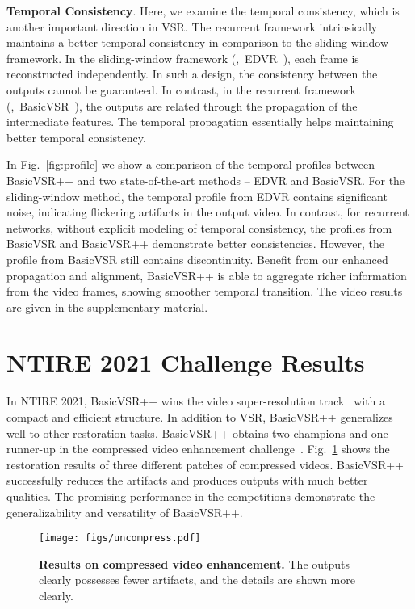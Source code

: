 \documentclass[10pt,twocolumn,letterpaper]{article}
\begin{document}
\noindent\textbf{Temporal Consistency}.
Here, we examine the temporal consistency, which is another important direction in VSR.
The recurrent framework intrinsically maintains a better temporal consistency in comparison to the sliding-window framework.
In the sliding-window framework (\eg,~EDVR~\cite{wang2019edvr}), each frame is reconstructed independently. In such a design, the consistency between the outputs cannot be guaranteed.
In contrast, in the recurrent framework (\eg,~BasicVSR~\cite{chan2021basicvsr}), the outputs are related through the propagation of the intermediate features. The temporal propagation essentially helps maintaining better temporal consistency.

In Fig.~\ref{fig:profile} we show a comparison of the temporal profiles between BasicVSR++ and two state-of-the-art methods -- EDVR and BasicVSR.
For the sliding-window method, the temporal profile from EDVR contains significant noise, indicating flickering artifacts in the output video.
In contrast, for recurrent networks, without explicit modeling of temporal consistency, the profiles from BasicVSR and BasicVSR++ demonstrate better consistencies.
However, the profile from BasicVSR still contains discontinuity. Benefit from our enhanced propagation and alignment, BasicVSR++ is able to aggregate richer information from the video frames, showing smoother temporal transition.
The video results are given in the supplementary material.

\section{NTIRE 2021 Challenge Results}
In NTIRE 2021, BasicVSR++ wins the video super-resolution track~\cite{son2021ntire} with a compact and efficient structure. In addition to VSR, BasicVSR++ generalizes well to other restoration tasks. BasicVSR++ obtains two champions and one runner-up in the compressed video enhancement challenge~\cite{yang2021ntire}. Fig.~\ref{fig:uncompress} shows the restoration results of three different patches of compressed videos. BasicVSR++ successfully reduces the artifacts and produces outputs with much better qualities. The promising performance in the competitions demonstrate the generalizability and versatility of BasicVSR++.
\begin{figure}[t]
    \begin{center}
        \texttt{[image: figs/uncompress.pdf]}
        \caption{\textbf{Results on compressed video enhancement.} The outputs clearly possesses fewer artifacts, and the details are shown more clearly.}
        \label{fig:uncompress}
    \end{center}
    \vspace{-0.7cm}
\end{figure}
\end{document}
